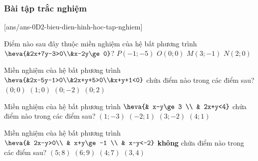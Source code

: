 \subsubsection{Bài tập trắc nghiệm}
[ans/ans-0D2-bieu-dien-hinh-hoc-tap-nghiem]
\begin{ex}%
	Điểm nào sau đây thuộc miền nghiệm của hệ bất phương trình $\heva{&2x+7y-3>0\\&x-2y\ge 0}$?
	\choice
	{$P(-1;-5)$}
	{$O(0;0)$}
	{$M(3;-1)$}
	{\True $N(2;0)$}
\end{ex}
\begin{ex}%
	Miền nghiệm của hệ bất phương trình $\heva{&2x-5y-1>0\\&2x+y+5>0\\&x+y+1<0}$ chứa điểm nào trong các điểm sau?
	\choice
	{$(0;0)$}
	{$(1;0)$}
	{\True $(0;-2)$}
	{$(0;2)$}
\end{ex}

\begin{ex}%
	Miền nghiệm của hệ bất phương trình $\heva{& x-y\ge 3 \\ & 2x+y<4}$ chứa điểm nào trong các điểm sau?
	\choice
	{\True $(1;-3)$}
	{$(-2;1)$}
	{$(3;-2)$}
	{$(4;1)$}
\end{ex}

\begin{ex}%
	Miền nghiệm của hệ bất phương trình $\heva{& 2x-y>0\\ & x+y\ge -1 \\ & x-y<-2}$ \textbf{không} chứa điểm nào trong các điểm sau?
	\choice
	{$(5;8)$}
	{$(6;9)$}
	{$(4;7)$}
	{\True $(3,4)$}
\end{ex}

